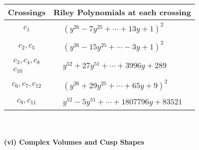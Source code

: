 \documentclass[1p]{elsarticle_modified}
\theoremstyle{definition}
\begin{document}
\begin{tabular}{m{50pt}|m{274pt}}
Crossings & \hspace{64pt}Riley Polynomials at each crossing \\
\hline $$\begin{aligned}c_{1}\end{aligned}$$&$\begin{aligned}
&(y^{26}-7 y^{25}+\cdots+13 y+1)^{2}
\end{aligned}$\\
\hline $$\begin{aligned}c_{2},c_{5}\end{aligned}$$&$\begin{aligned}
&(y^{26}-15 y^{25}+\cdots-3 y+1)^{2}
\end{aligned}$\\
\hline $$\begin{aligned}c_{3},c_{4},c_{8}\\c_{10}\end{aligned}$$&$\begin{aligned}
&y^{52}+27 y^{51}+\cdots+3996 y+289
\end{aligned}$\\
\hline $$\begin{aligned}c_{6},c_{7},c_{12}\end{aligned}$$&$\begin{aligned}
&(y^{26}+29 y^{25}+\cdots+65 y+9)^{2}
\end{aligned}$\\
\hline $$\begin{aligned}c_{9},c_{11}\end{aligned}$$&$\begin{aligned}
&y^{52}-5 y^{51}+\cdots+1807796 y+83521
\end{aligned}$\\
\hline
\end{tabular}\\~\\
\newpage\flushleft \textbf{(vi) Complex Volumes and Cusp Shapes}
\end{document}

